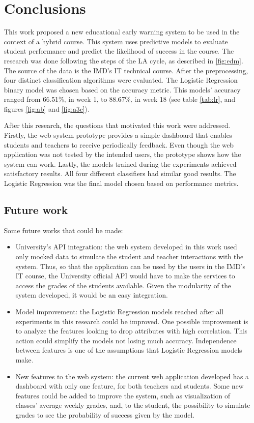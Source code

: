 \chapter{Conclusions}
\label{ch:Conclusions}

This work proposed a new educational early warning system to be used in the context of a hybrid course. This system uses predictive models to evaluate student performance and predict the likelihood of success in the course. The research was done following the steps of the LA cycle, as described in \ref{fig:edm}. The source of the data is the IMD's IT technical course. After the preprocessing, four distinct classification algorithms were evaluated. The Logistic Regression binary model was chosen based on the accuracy metric. This models' accuracy ranged from 66.51\%, in week 1, to 88.67\%, in week 18 (see table \ref{tab:lr}, and figures \ref{fig:ab} and \ref{fig:a3c}).

After this research, the questions that motivated this work were addressed. Firstly, the web system prototype provides a simple dashboard that enables students and teachers to receive periodically feedback. Even though the web application was not tested by the intended users, the prototype shows how the system can work. Lastly, the models trained during the experiments achieved satisfactory results. All four different classifiers had similar good results. The Logistic Regression was the final model chosen based on performance metrics.

\section{Future work}

Some future works that could be made:

\begin{itemize}
    \item University's API integration: the web system developed in this work used only mocked data to simulate the student and teacher interactions with the system. Thus, so that the application can be used by the users in the IMD's IT course, the University official API would have to make the services to access the grades of the students available. Given the modularity of the system developed, it would be an easy integration.
    \item Model improvement: the Logistic Regression models reached after all experiments in this research could be improved. One possible improvement is to analyze the features looking to drop attributes with high correlation. This action could simplify the models not losing much accuracy. Independence between features is one of the assumptions that Logistic Regression models make.
    \item New features to the web system: the current web application developed has a dashboard with only one feature, for both teachers and students. Some new features could be added to improve the system, such as visualization of classes' average weekly grades, and, to the student, the possibility to simulate grades to see the probability of success given by the model.
\end{itemize}